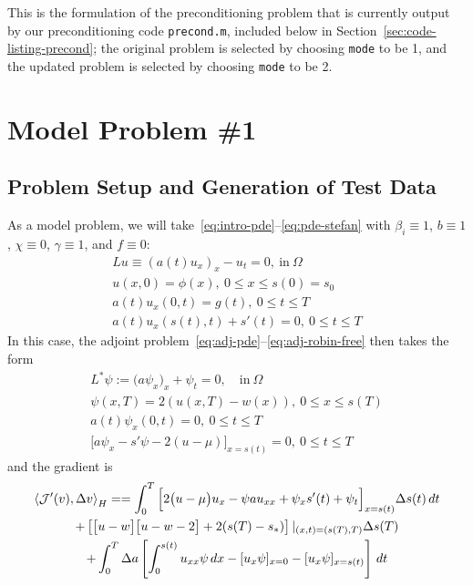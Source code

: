 \documentclass[letterpaper, 10pt, draft]{amsart}
\theoremstyle{definition}
\theoremstyle{remark}
\begin{document}
This is the formulation of the preconditioning problem that is currently output
by our preconditioning code \verb+precond.m+, included below in
Section~\ref{sec:code-listing-precond}; the original problem is selected by
choosing \verb+mode+ to be 1, and the updated problem is selected by choosing
\verb+mode+ to be 2.

\section{Model Problem \#1}\label{sec:model-problem-1}

\subsection{Problem Setup and Generation of Test Data}

As a model problem, we will take~\eqref{eq:intro-pde}--\eqref{eq:pde-stefan}
with $\beta_i \equiv 1$, $b\equiv 1$, $\chi \equiv 0$, $\gamma \equiv 1$, and
$f\equiv 0$:
\begin{gather}
  Lu \equiv {(a(t) u_x)}_x - u_{t} = 0,~\text{in}~\Omega
  \\
  u(x,0) = \phi (x),~0 \leq x \leq s(0) = s_0
  \\
  a(t) u_x (0,t) = g(t),~0 \leq t \leq T
  \\
  a(t) u_x (s(t),t) + s'(t) = 0,~0 \leq t \leq
  T
\end{gather}
In this case, the adjoint problem~\eqref{eq:adj-pde}--\eqref{eq:adj-robin-free} then takes the form
\begin{gather}
  L^{*} \psi := \big(a \psi_x\big)_x + \psi_t = 0,\quad\text{in}~\Omega
  \\
  \psi(x, T) = 2(u(x, T) - w(x)),~0 \leq x \leq s(T)
  \\
  a(t)\psi_x(0, t) =0,~0 \leq t \leq T
  \\
  \Big[a \psi_x - s'\psi - 2 (u - \mu)\Big]_{x=s(t)}=0, ~0 \leq t \leq T
\end{gather}
and the gradient is
\begin{gather}
  \left\langle \mathcal{J}'(v),\Delta v \right\rangle_H
  = =\int_0^T \Big[
  2\big(u - \mu\big)u_x
  - \psi  a u_{xx}
  + \psi_x s'(t)
  + \psi_t
  \Big]_{x=s(t)} {\Delta s}(t)\,dt \nonumber
  \\
  +
  \left[
    \big[u - w\big]\big[u - w - 2\big] + 2 (s(T) - s_*)
  \right]\vert_{(x,t)=(s(T),T)} {\Delta s}(T)\nonumber
  \\
  + \int_0^T {\Delta a} \left[
    \int_0^{s(t)}  u_{xx} \psi \,dx
    - [u_x \psi]_{x=0}
    - [u_x\psi]_{x=s(t)}
  \right]\,dt\nonumber
\end{gather}
\end{document}
